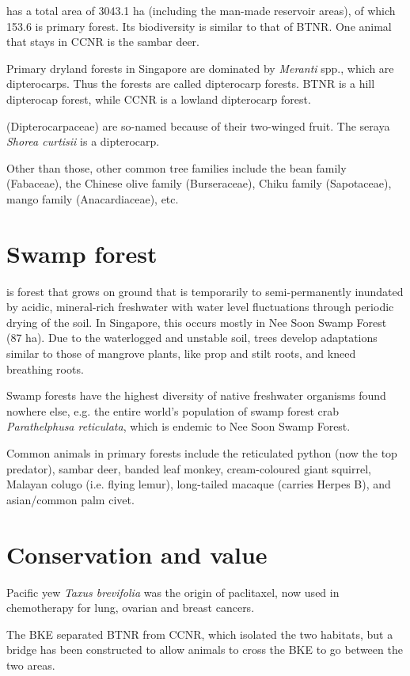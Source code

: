 \documentclass{slnotes}
\newcommand{\scn}[1]{\textit{#1}}
\begin{document}
 has a total area of 3043.1 ha (including the man-made reservoir areas), of which 153.6 is primary forest. Its biodiversity is similar to that of BTNR. One animal that stays in CCNR is the sambar deer.

Primary dryland forests in Singapore are dominated by \scn{Meranti} spp., which are dipterocarps. Thus the forests are called dipterocarp forests. BTNR is a hill dipterocap forest, while CCNR is a lowland dipterocarp forest.

 (Dipterocarpaceae) are so-named because of their two-winged fruit. The seraya \scn{Shorea curtisii} is a dipterocarp.

Other than those, other common tree families include the bean family (Fabaceae), the Chinese olive family (Burseraceae), Chiku family (Sapotaceae), mango family (Anacardiaceae), etc.
\section{Swamp forest}
 is forest that grows on ground that is temporarily to semi-permanently inundated by acidic, mineral-rich freshwater with water level fluctuations through periodic drying of the soil. In Singapore, this occurs mostly in Nee Soon Swamp Forest (87 ha). Due to the waterlogged and unstable soil, trees develop adaptations similar to those of mangrove plants, like prop and stilt roots, and kneed breathing roots.

Swamp forests have the highest diversity of native freshwater organisms found nowhere else, e.g. the entire world's population of swamp forest crab \scn{Parathelphusa reticulata}, which is endemic to Nee Soon Swamp Forest.

Common animals in primary forests include the reticulated python (now the top predator), sambar deer, banded leaf monkey, cream-coloured giant squirrel, Malayan colugo (i.e. flying lemur), long-tailed macaque (carries Herpes B), and asian/common palm civet.
\section{Conservation and value}
Pacific yew \scn{Taxus brevifolia} was the origin of paclitaxel, now used in chemotherapy for lung, ovarian and breast cancers.

The BKE separated BTNR from CCNR, which isolated the two habitats, but a bridge has been constructed to allow animals to cross the BKE to go between the two areas.
\end{document}
